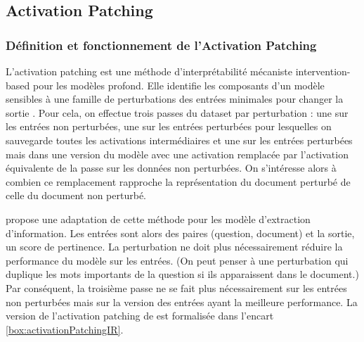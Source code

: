     \subsection{Activation Patching}


        \subsubsection{Définition et fonctionnement de l'Activation Patching}
            L'activation patching est une méthode d'interprétabilité mécaniste intervention-based pour les modèles profond. Elle identifie les composants d'un modèle sensibles à une famille de perturbations des entrées minimales pour changer la sortie \cite{geiger_causal_2021}. Pour cela, on effectue trois passes du dataset par perturbation : une sur les entrées non perturbées, une sur les entrées perturbées pour lesquelles on sauvegarde toutes les activations intermédiaires et une sur les entrées perturbées mais dans une version du modèle avec une activation remplacée par l'activation équivalente de la passe sur les données non perturbées. On s'intéresse alors à combien ce remplacement rapproche la représentation du document perturbé de celle du document non perturbé. %

            \cite{chen_axiomatic_2024} propose une adaptation de cette méthode pour les modèle d'extraction d'information. Les entrées sont alors des paires (question, document) et la sortie, un score de pertinence. La perturbation ne doit plus nécessairement réduire la performance du modèle sur les entrées. (On peut penser à une perturbation qui duplique les mots importants de la question si ils apparaissent dans le document.) Par conséquent, la troisième passe ne se fait plus nécessairement sur les entrées non perturbées mais sur la version des entrées ayant la meilleure performance. %
            La version de l'activation patching de \cite{chen_axiomatic_2024} est formalisée dans l'encart \ref{box:activationPatchingIR}. 

